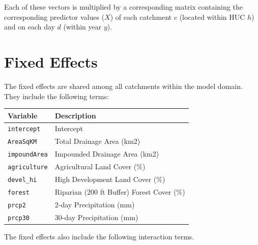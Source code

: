 \documentclass[
]{book}
\begin{document}
Each of these vectors is multiplied by a corresponding matrix containing the corresponding predictor values (\(X\)) of each catchment \(c\) (located within HUC \(h\)) and on each day \(d\) (within year \(y\)).

\section{Fixed Effects}\label{fixed-effects}

The fixed effects are shared among all catchments within the model domain. They include the following terms:

\begin{longtable}[]{@{}ll@{}}
\toprule\noalign{}
Variable & Description \\
\midrule\noalign{}
\endhead
\bottomrule\noalign{}
\endlastfoot
\texttt{intercept} & Intercept \\
\texttt{AreaSqKM} & Total Drainage Area (km2) \\
\texttt{impoundArea} & Impounded Drainage Area (km2) \\
\texttt{agriculture} & Agricultural Land Cover (\%) \\
\texttt{devel\_hi} & High Development Land Cover (\%) \\
\texttt{forest} & Riparian (200 ft Buffer) Forest Cover (\%) \\
\texttt{prcp2} & 2-day Precipitation (mm) \\
\texttt{prcp30} & 30-day Precipitation (mm) \\
\end{longtable}

The fixed effects also include the following interaction terms.
\end{document}

